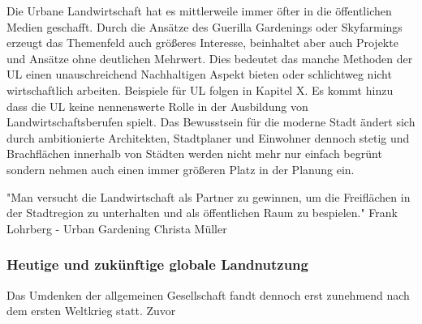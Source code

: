 \documentclass{article}
\begin{document}
Die Urbane Landwirtschaft hat es mittlerweile immer öfter in die öffentlichen Medien geschafft. Durch die Ansätze des Guerilla Gardenings oder Skyfarmings erzeugt das Themenfeld auch größeres Interesse, beinhaltet aber auch Projekte und Ansätze ohne deutlichen Mehrwert. Dies bedeutet das manche Methoden der UL einen unauschreichend Nachhaltigen Aspekt bieten oder schlichtweg nicht wirtschaftlich arbeiten. Beispiele für UL folgen in Kapitel X. Es kommt hinzu dass die UL keine nennenswerte Rolle in der Ausbildung von Landwirtschaftsberufen spielt. Das Bewusstsein für die moderne Stadt ändert sich durch ambitionierte Architekten, Stadtplaner und Einwohner dennoch stetig und Brachflächen innerhalb von Städten werden nicht mehr nur einfach begrünt sondern nehmen auch einen immer größeren Platz in der Planung ein. 

"Man versucht die Landwirtschaft als Partner zu gewinnen, um die Freiflächen in der Stadtregion zu unterhalten und als öffentlichen Raum zu bespielen." Frank Lohrberg - Urban Gardening Christa Müller

\subsubsection{Heutige und zukünftige globale Landnutzung}


Das Umdenken der allgemeinen Gesellschaft fandt dennoch erst zunehmend nach dem ersten Weltkrieg statt. Zuvor 



\newpage
\listoffigures

\begingroup
\singlespacing
\setlength\bibitemsep{10pt}%
\printbibliography
\endgroup
\end{document}
